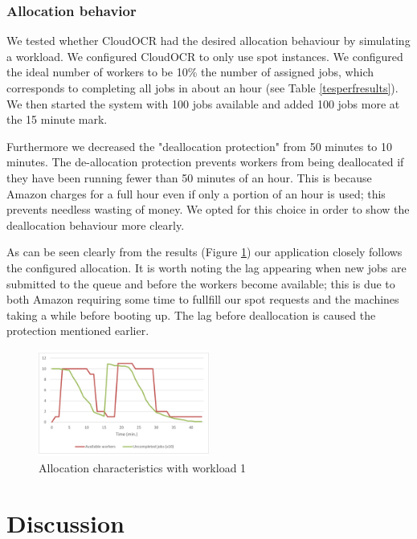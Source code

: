 \documentclass[a4paper]{IEEEtran}
\begin{document}
\subsubsection{Allocation behavior}

We tested whether CloudOCR had the desired allocation behaviour by simulating a workload. We configured CloudOCR to only use spot instances. We configured the ideal number of workers to be 10\% the number of assigned jobs, which corresponds to completing all jobs in about an hour (see Table \ref{tesperfresults}). We then started the system with 100 jobs available and added 100 jobs more at the 15 minute mark.

Furthermore we decreased the "deallocation protection" from 50 minutes to 10 minutes. The de-allocation protection prevents workers from being deallocated if they have been running fewer than 50 minutes of an hour. This is because Amazon charges for a full hour even if only a portion of an hour is used; this prevents needless wasting of money. We opted for this choice in order to show the deallocation behaviour more clearly. 

As can be seen clearly from the results (Figure \ref{fig_allperfresults}) our application closely follows the configured allocation. It is worth noting the lag appearing when new jobs are submitted to the queue and before the workers become available; this is due to both Amazon requiring some time to fullfill our spot requests and the machines taking a while before booting up. The lag before deallocation is caused the protection mentioned earlier.

\begin{figure}
\centering
\includegraphics[width=0.5\textwidth]{"results-allocation-2"}
\caption{Allocation characteristics with workload 1}
\label{fig_allperfresults}
\end{figure}
 
\section{Discussion}
\label{sec:discussion}
\end{document}
